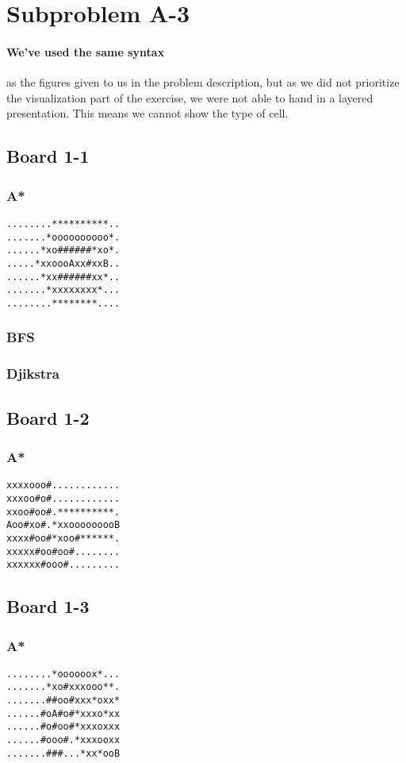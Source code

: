 \documentclass[11pt,a4paper]{article}
\begin{document}
\section*{Subproblem A-3}
\paragraph{We've used the same syntax} as the figures given to us in the problem description, but as we did not prioritize the visualization part of the exercise, we were not able to hand in a layered presentation. This means we cannot show the type of cell.

\subsection*{Board 1-1}
\subsubsection*{A*}
\begin{lstlisting}
........**********..
.......*oooooooooo*.
......*xo######*xo*.
.....*xxoooAxx#xxB..
......*xx######xx*..
.......*xxxxxxxx*...
........********....
\end{lstlisting}

\subsubsection*{BFS}

\subsubsection*{Djikstra}
\subsection*{Board 1-2}
\subsubsection*{A*}
\begin{lstlisting}
xxxxooo#............
xxxoo#o#............
xxoo#oo#.**********.
Aoo#xo#.*xxooooooooB
xxxx#oo#*xoo#******.
xxxxx#oo#oo#........
xxxxxx#ooo#.........
\end{lstlisting}

\subsection*{Board 1-3}
\subsubsection*{A*}
\begin{lstlisting}
........*oooooox*...
.......*xo#xxxooo**.
.......##oo#xxx*oxx*
......#oA#o#*xxxo*xx
......#o#oo#*xxxoxxx
......#ooo#.*xxxooxx
.......###...*xx*ooB
\end{lstlisting}
\end{document}
